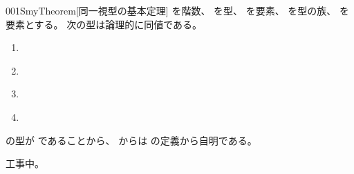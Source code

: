 \documentclass[index]{subfiles}
\begin{document}
\begin{myBlock}{001S}{myTheorem}[同一視型の基本定理]
  を階数、
  を型、
  を要素、
  を型の族、
  を要素とする。
  次の型は論理的に同値である。
  \begin{enumerate}
  \item \label{001S:0000} 
  \item \label{001S:0001} 
  \item \label{001S:0002} 
  \item \label{001S:0003} 
  \end{enumerate}
\end{myBlock}
\begin{myProof}
  の型が
  であることから、
  からは
  \myInlineMath{\myEquiv}の定義から自明である。

  工事中。
\end{myProof}
\end{document}

